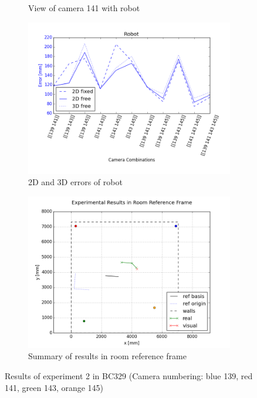 \begin{figure}[H]
\begin{subfigure}{0.49\linewidth}
        \caption{View of camera 141 with robot}
    \end{subfigure}
    \begin{subfigure}{0.49\linewidth}
        \includegraphics[width=\linewidth]{files/res2_combi_rob.png}
        \caption{2D and 3D errors of robot}
    \end{subfigure}
    \begin{subfigure}{0.6\linewidth}
        \includegraphics[width=\linewidth]{files/res2_room.png}
        \caption{Summary of results in room reference frame}
    \end{subfigure}
    \caption{Results of experiment 2 in BC329 (Camera numbering: blue 139, red 141, green 143, orange 145)}
    \label{fig:experiment1}
\end{figure}





